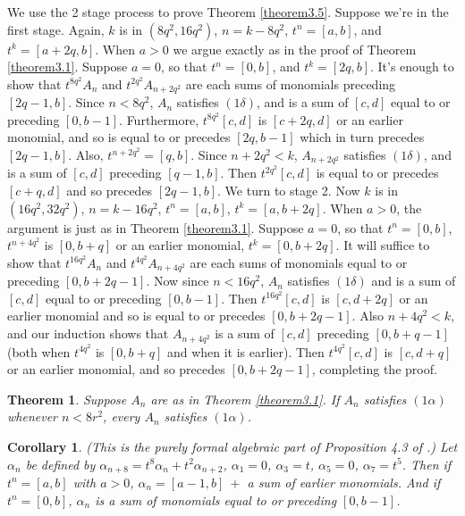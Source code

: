 \documentclass{monsky2009}
\newtheorem{theorem}[definition]{Theorem}
\newtheorem{corollary}[definition]{Corollary}
\begin{document}
We use the 2 stage process to prove Theorem \ref{theorem3.5}. Suppose we're in the first stage. Again, $k$ is in $(8q^{2}, 16q^{2})$, $n=k-8q^{2}$, $t^{n}=[a,b]$, and $t^{k}=[a+2q, b]$.  When $a>0$ we argue exactly as in the proof of Theorem \ref{theorem3.1}. Suppose $a=0$, so that $t^{n}=[0,b]$, and  $t^{k}=[2q, b]$. It's enough to show that $t^{8q^{2}}A_{n}$ and $t^{2q^{2}}A_{n+2q^{2}}$ are each sums of monomials preceding $[2q-1,b]$. Since $n<8q^{2}$, $A_{n}$ satisfies $(1\delta)$, and is a sum of $[c,d]$ equal to or preceding $[0,b-1]$. Furthermore, $t^{8q^{2}}[c,d]$ is $[c+2q,d]$ or an earlier monomial, and so is equal to or precedes $[2q,b-1]$ which in turn precedes $[2q-1,b]$. Also, $t^{n+2q^{2}}=[q,b]$. Since $n+2q^{2}<k$, $A_{n+2q^{2}}$ satisfies $(1\delta)$, and is a sum of $[c,d]$ preceding $[q-1,b]$. Then $t^{2q^{2}}[c,d]$ is equal to or precedes $[c+q,d]$ and so precedes $[2q-1,b]$. We turn to stage 2. Now $k$ is in $(16q^{2},32q^{2})$, $n=k-16q^{2}$, $t^{n}=[a,b]$, $t^{k}=[a,b+2q]$. When $a>0$, the argument is just as in Theorem \ref{theorem3.1}. Suppose $a=0$, so that $t^{n}=[0,b]$, $t^{n+4q^{2}}$ is $[0,b+q]$ or an earlier monomial, $t^{k}=[0,b+2q]$.  It will suffice to show that $t^{16q^{2}}A_{n}$ and $t^{4q^{2}}A_{n+4q^{2}}$ are each sums of monomials equal to or preceding $[0,b+2q-1]$. Now since $n<16q^{2}$, $A_{n}$ satisfies $(1\delta)$ and is a sum of $[c,d]$ equal to or preceding $[0,b-1]$. Then $t^{16q^{2}}[c,d]$ is $[c,d+2q]$ or an earlier monomial and so is equal to or precedes $[0,b+2q-1]$. Also $n+4q^{2}<k$, and our induction shows that $A_{n+4q^{2}}$ is a sum of $[c,d]$ preceding $[0,b+q-1]$ (both when $t^{4q^{2}}$ is $[0,b+q]$ and when it is earlier). Then  $t^{4q^{2}}[c,d]$ is $[c,d+q]$ or an earlier monomial, and so precedes $[0,b+2q-1]$, completing the proof.

\begin{theorem}
\label{theorem3.7}
Suppose $A_{n}$ are as in Theorem \ref{theorem3.1}. If $A_{n}$ satisfies $(1\alpha)$ whenever $n<8r^{2}$, every $A_{n}$ satisfies $(1\alpha)$.
\end{theorem}

\begin{corollary}%
\label{corollary3.8}
(This is the purely formal algebraic part of Proposition 4.3 of \cite{6}.)  Let $\alpha_{n}$ be defined by $\alpha_{n+8}=t^{8}\alpha_{n}+t^{2}\alpha_{n+2}$, $\alpha_{1}=0$, $\alpha_{3}=t$, $\alpha_{5}=0$, $\alpha_{7}=t^{5}$. Then if $t^{n}=[a,b]$ with $a>0$, $\alpha_{n}=[a-1,b]\ +$ a sum of earlier monomials.  And if $t^{n}=[0,b]$, $\alpha_{n}$ is a sum of monomials equal to or preceding $[0,b-1]$.
\end{corollary}
\end{document}
